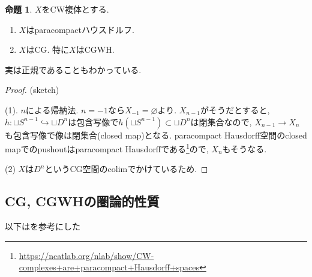 \documentclass[dvipdfmx,a4paper,11pt]{article}
\newcommand{\N}{\mathbb{N}}
\theoremstyle{definition}
\newtheorem{prop}[thm]{命題}
\begin{document}
 \begin{tcolorbox}
 [colback = white, colframe = green!35!black, fonttitle = \bfseries,breakable = true]
\begin{prop}
$X$をCW複体とする. 
\begin{enumerate}
\item $X$はparacompactハウスドルフ.
\item $X$はCG. 特に$X$はCGWH.
\end{enumerate}
\end{prop}
\end{tcolorbox}
実は正規であることもわかっている.
\begin{proof}(sketch)

(1). $n$による帰納法. $n=-1$なら$X_{-1} = \varnothing$より. 
$X_{n-1}$がそうだとすると, $h : \sqcup S^{n-1} \hookrightarrow \sqcup D^{n}$は包含写像で$h(\sqcup S^{n-1}) \subset \sqcup D^{n}$は閉集合なので, $X_{n-1} \to X_{n}$も包含写像で像は閉集合(closed map)となる. 
paracompact Hausdorff空間のclosed mapでのpushoutはparacompact Hausdorffである\footnote{\url{https://ncatlab.org/nlab/show/CW-complexes+are+paracompact+Hausdorff+spaces}}ので, $X_{n}$もそうなる. 

(2) $X$は$D^{n}$というCG空間のcolimでかけているため. 
\begin{comment}


[0] CW複体を低次元の場合にかきくだす. 
$X_{-1} = \varnoting$より, 
$$X_0 = X_{-1} \sqcup_{(\phi_i)_{i \in I_0}} \sqcup_{i \in I_0} D^{0} =  \sqcup_{i \in I_0} \ast$$
とかける. 
よって
$$
X_1 =  X_0 \sqcup_{(\phi_i)_{i \in I_0}} \sqcup_{i \in I_0} D^{1}
= (\sqcup_{i \in I_0} \ast)\sqcup_{(\phi_i)_{i \in I_1}} \sqcup_{i \in I_0} D^{1}
$$
となる． ここで$i_1 : S_0 = \ast \sqcup \ast \to D^1$である. 

[1] ハウスドルフ性の証明. 
$n$に関する数学的帰納法で示す.

[1-1] $n=1$の時.  $x, y \in X_1 = X_0\sqcup_{(\phi_i)_{i \in I_1}} \sqcup_{i \in I_0} D^{1}$とする. 
$x \in X_0$の場合は$\{ x\}$が$X_0$の開集合になり, 


\end{comment}
\end{proof}




\subsection{CG, CGWHの圏論的性質}
以下は\cite{Fra}を参考にした
\end{document}
